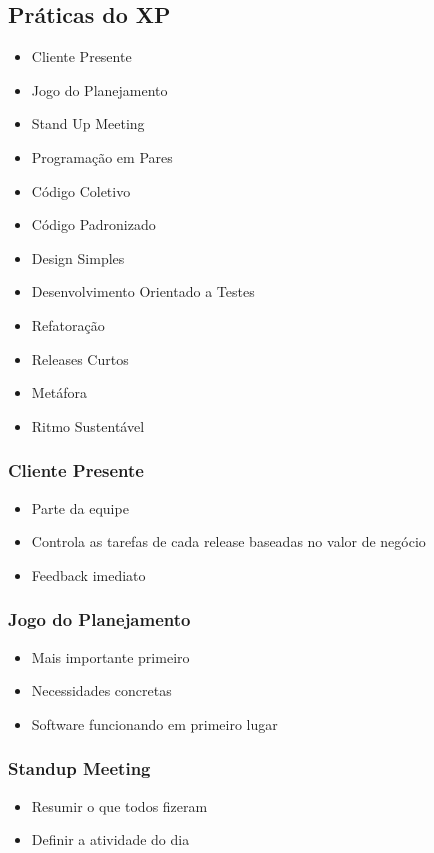 \documentclass[10pt]{beamer}
\begin{document}
\subsection{Práticas do XP}
\begin{frame}
  \begin{itemize}
  \item Cliente Presente
  \item Jogo do Planejamento
  \item Stand Up Meeting
  \item Programação em Pares
  \item Código Coletivo
  \item Código Padronizado
  \item Design Simples
  \item Desenvolvimento Orientado a Testes
  \item Refatoração
  \item Releases Curtos
  \item Metáfora
  \item Ritmo Sustentável
  \end{itemize}
\end{frame}

\begin{frame}
  \frametitle{Cliente Presente}
  \begin{itemize}
  \item Parte da equipe
  \item Controla as tarefas de cada release baseadas no valor de negócio
  \item Feedback imediato
  \end{itemize}
\end{frame}

\begin{frame}
  \frametitle{Jogo do Planejamento}
  \begin{itemize}
  \item Mais importante primeiro
  \item Necessidades concretas
  \item Software funcionando em primeiro lugar
  \end{itemize}
\end{frame}

\begin{frame}
  \frametitle{Standup Meeting}
  \begin{itemize}
  \item Resumir o que todos fizeram
  \item Definir a atividade do dia
  \end{itemize}
\end{frame}
\end{document}
